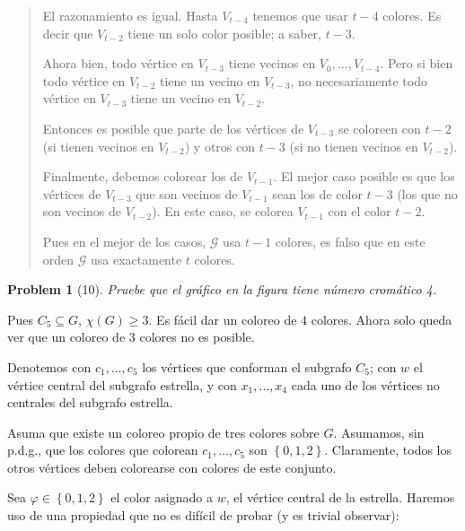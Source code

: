 \documentclass[a4paper]{article}
\newtheorem{problem}{Problem}
\newtheorem{problem}{Problem}
\begin{document}
\small
\begin{quote}

    El razonamiento es igual. Hasta $V_{t - 4}$ tenemos que usar $t - 4$
    colores. Es decir que $V_{t - 2}$ tiene un solo color posible; a saber, $t -
    3$. 

    Ahora bien, todo vértice en $V_{t - 3}$ tiene vecinos en $V_0, \ldots, V_{t
    - 4}$. Pero si bien todo vértice en $V_{t - 2}$ tiene un vecino en $V_{t -
    3}$, no necesariamente todo vértice en $V_{t -3}$ tiene un vecino en $V_{t
    -2}$. 

    Entonces es posible que parte de los vértices de $V_{t-3}$ se coloreen con
    $t - 2$ (si tienen vecinos en $V_{t-2}$) y otros con $t - 3$ (si no tienen
    vecinos en $V_{t-2}$).

    Finalmente, debemos colorear los de $V_{t - 1}$. El mejor caso posible es
    que los vértices de $V_{t - 3}$ que son vecinos de $V_{t -
    1}$ sean los de color $t - 3$ (los que no son vecinos de $V_{t - 2}$). En
    este caso, se colorea $V_{t - 1}$ con el color $t - 2$.

    Pues en el mejor de los casos, $\mathscr{G}$ usa $t - 1$ colores, es falso que en
    este orden $\mathscr{G}$ usa exactamente $t$ colores.


\end{quote}
\normalsize

\pagebreak 

\begin{problem}[10]
    Pruebe que el gráfico en la figura tiene número cromático 4.
\end{problem}

Pues $C_5 \subseteq G$, $\chi(G) \geq 3$. Es fácil dar un coloreo de $4$ colores. 
Ahora solo queda ver que un coloreo de 3 colores no es posible.

Denotemos con $c_1, \ldots, c_5$ los vértices que conforman el subgrafo 
$C_5$; con $w$ el vértice central del subgrafo estrella, y con 
$x_1, \ldots, x_4$ cada uno de los vértices no centrales 
del subgrafo estrella.

Asuma que existe un coloreo propio de tres colores sobre $G$. Asumamos, sin
p.d.g., que los colores que colorean $c_1, \ldots, c_5$ son $\left\{ 0, 1, 2
\right\} $. Claramente, todos los otros vértices deben colorearse 
con colores de este conjunto. 

Sea $\varphi \in \left\{ 0, 1, 2 \right\} $ el color asignado a $w$, el vértice
central de la estrella. Haremos uso de una propiedad que 
no es difícil de probar (y es trivial observar):
\end{document}
